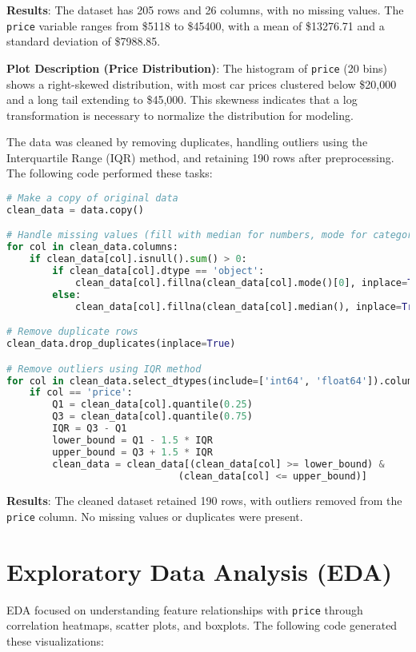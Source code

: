 \documentclass[12pt]{article}
\begin{document}
\textbf{Results}: The dataset has 205 rows and 26 columns, with no missing values. The \texttt{price} variable ranges from \$5118 to \$45400, with a mean of \$13276.71 and a standard deviation of \$7988.85.

\textbf{Plot Description (Price Distribution)}: The histogram of \texttt{price} (20 bins) shows a right-skewed distribution, with most car prices clustered below \$20,000 and a long tail extending to \$45,000. This skewness indicates that a log transformation is necessary to normalize the distribution for modeling.

The data was cleaned by removing duplicates, handling outliers using the Interquartile Range (IQR) method, and retaining 190 rows after preprocessing. The following code performed these tasks:

\begin{lstlisting}[language=Python, caption=Data Cleaning Code]
# Make a copy of original data
clean_data = data.copy()

# Handle missing values (fill with median for numbers, mode for categories)
for col in clean_data.columns:
    if clean_data[col].isnull().sum() > 0:
        if clean_data[col].dtype == 'object':
            clean_data[col].fillna(clean_data[col].mode()[0], inplace=True)
        else:
            clean_data[col].fillna(clean_data[col].median(), inplace=True)

# Remove duplicate rows
clean_data.drop_duplicates(inplace=True)

# Remove outliers using IQR method
for col in clean_data.select_dtypes(include=['int64', 'float64']).columns:
    if col == 'price':
        Q1 = clean_data[col].quantile(0.25)
        Q3 = clean_data[col].quantile(0.75)
        IQR = Q3 - Q1
        lower_bound = Q1 - 1.5 * IQR
        upper_bound = Q3 + 1.5 * IQR
        clean_data = clean_data[(clean_data[col] >= lower_bound) & 
                              (clean_data[col] <= upper_bound)]
\end{lstlisting}

\textbf{Results}: The cleaned dataset retained 190 rows, with outliers removed from the \texttt{price} column. No missing values or duplicates were present.

\section{Exploratory Data Analysis (EDA)}
EDA focused on understanding feature relationships with \texttt{price} through correlation heatmaps, scatter plots, and boxplots. The following code generated these visualizations:
\end{document}
